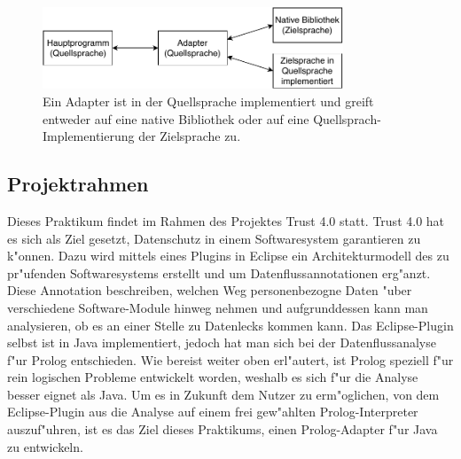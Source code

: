 \begin{figure}[h]
\centering
\includegraphics[width=0.8\textwidth]{adapter.pdf}
\caption{Ein Adapter ist in der Quellsprache implementiert und greift entweder auf eine native Bibliothek oder auf eine Quellsprach-Implementierung der Zielsprache zu.}
\label{fig:adpater}
\end{figure}

\subsection{Projektrahmen}
\label{projektrahmen}
Dieses Praktikum findet im Rahmen des Projektes Trust 4.0\cite{trust40} statt. Trust 4.0 hat es sich als Ziel gesetzt, Datenschutz in einem Softwaresystem garantieren zu k"onnen. Dazu wird mittels eines Plugins in Eclipse ein Architekturmodell des zu pr"ufenden Softwaresystems erstellt und um Datenflussannotationen erg"anzt. Diese Annotation beschreiben, welchen Weg personenbezogne Daten "uber verschiedene Software-Module hinweg nehmen und aufgrunddessen kann man analysieren, ob es an einer Stelle zu Datenlecks kommen kann. Das Eclipse-Plugin selbst ist in Java implementiert, jedoch hat man sich bei der Datenflussanalyse f"ur Prolog entschieden.  Wie bereist weiter oben erl"autert, ist Prolog speziell f"ur rein logischen Probleme entwickelt worden, weshalb es sich f"ur die Analyse besser eignet als Java. Um es in Zukunft dem Nutzer zu erm"oglichen, von dem Eclipse-Plugin aus die Analyse auf einem frei gew"ahlten Prolog-Interpreter auszuf"uhren, ist es das Ziel dieses Praktikums, einen Prolog-Adapter f"ur Java zu entwickeln.
